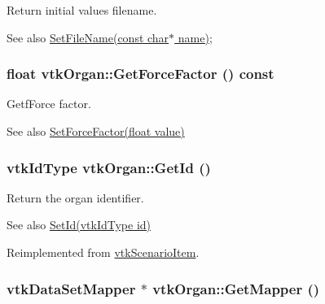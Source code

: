 Return initial values filename. 

\begin{DoxySeeAlso}{See also}
\hyperlink{classvtkOrgan_a9fad20fc19aadd62505ed6a39e482d23}{SetFileName(const char$\ast$ name)}; 
\end{DoxySeeAlso}
\hypertarget{classvtkOrgan_a81b39e0f98712affccd17071791f6ad7}{
\subsubsection[{GetForceFactor}]{\setlength{\rightskip}{0pt plus 5cm}float vtkOrgan::GetForceFactor () const}}
\label{classvtkOrgan_a81b39e0f98712affccd17071791f6ad7}


GetfForce factor. 

\begin{DoxySeeAlso}{See also}
\hyperlink{classvtkOrgan_ae98b19d50a8f351e79e881b579215953}{SetForceFactor(float value)} 
\end{DoxySeeAlso}
\hypertarget{classvtkOrgan_a8e45f79da9c4e7029492ced2f55c25ed}{
\subsubsection[{GetId}]{\setlength{\rightskip}{0pt plus 5cm}vtkIdType vtkOrgan::GetId ()}}
\label{classvtkOrgan_a8e45f79da9c4e7029492ced2f55c25ed}


Return the organ identifier. 

\begin{DoxySeeAlso}{See also}
\hyperlink{classvtkOrgan_a0aab831b4e0a9d33ba961a0907b73e80}{SetId(vtkIdType id)} 
\end{DoxySeeAlso}


Reimplemented from \hyperlink{classvtkScenarioItem_a9884061bd42ee058291d95a67ddcac20}{vtkScenarioItem}.

\hypertarget{classvtkOrgan_af638d5ed23ec53237ec15089ef5cbadc}{
\subsubsection[{GetMapper}]{\setlength{\rightskip}{0pt plus 5cm}vtkDataSetMapper $\ast$ vtkOrgan::GetMapper ()}}
\label{classvtkOrgan_af638d5ed23ec53237ec15089ef5cbadc}


